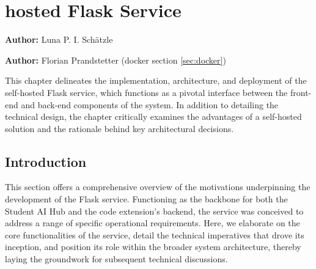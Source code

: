\chapter{hosted Flask Service}
\label{cha:hosted_flask_service}
\textbf{Author:} Luna P. I. Schätzle

\textbf{Author:} Florian Prandstetter (docker section \ref{sec:docker})

This chapter delineates the implementation, architecture, and deployment of the self-hosted Flask service, 
which functions as a pivotal interface between the front-end and back-end components of the system. 
In addition to detailing the technical design, the chapter critically examines the advantages of a self-hosted solution 
and the rationale behind key architectural decisions.

\section{Introduction}
This section offers a comprehensive overview of the motivations underpinning the development of the Flask service. 
Functioning as the backbone for both the Student AI Hub and the code extension’s backend, 
the service was conceived to address a range of specific operational requirements. 
Here, we elaborate on the core functionalities of the service, detail the technical imperatives that drove its inception, 
and position its role within the broader system architecture, thereby laying the groundwork for subsequent technical discussions.

